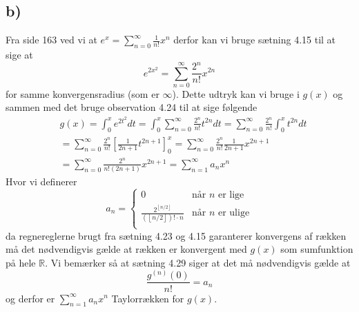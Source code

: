 \documentclass{article}
\newcommand{\m}[1]{\mathbb{#1}}
\newcommand{\mR}{\m{R}}
\newcommand{\lrb}[1]{\left[ #1\right]}
\newcommand{\floor}[1]{\left\lfloor #1\right\rfloor}
\begin{document}
\subsection*{b)}
Fra side 163 \cite{an1} ved vi at $e^x = \sum_{n=0}^{\infty}{\frac{1}{n!}x^n}$ derfor kan vi bruge sætning 4.15 
til at sige at
\[
    e^{2x^2} = \sum_{n=0}^{\infty} \frac{2^n}{n!} x^{2n}
\]
for samme konvergensradius (som er $\infty$).
Dette udtryk kan vi bruge i $g(x)$ og sammen med det bruge observation 4.24 \cite{an1} til at sige følgende
\begin{align*}
    &g(x) = \int_{0}^{x} e^{2t^2} dt
    = \int_{0}^{x} \sum_{n=0}^{\infty} \frac{2^n}{n!} t^{2n} dt
    = \sum_{n=0}^{\infty} \frac{2^n}{n!} \int_{0}^{x} t^{2n} dt \\
    &= \sum_{n=0}^{\infty} \frac{2^n}{n!} \lrb{\frac{1}{2n+1} t^{2n+1}}_{0}^x
    = \sum_{n=0}^{\infty} \frac{2^n}{n!} \frac{1}{2n+1} x^{2n+1} \\
    &= \sum_{n=0}^{\infty} \frac{2^n}{n!(2n+1)} x^{2n+1}
    = \sum_{n=1}^{\infty} a_n x^{n}
\end{align*}
Hvor vi definerer
\[
    a_n = 
    \begin{cases}
    0 & \text{når } n \text{ er lige} \\
    \frac{2^{\floor{n/2}}}{(\floor{n/2})! \cdot n} & \text{når } n \text{ er ulige} \\
    \end{cases} 
\]
da regnereglerne brugt fra sætning 4.23 og 4.15 \cite{an1} garanterer konvergens af rækken må det nødvendigvis
gælde at rækken er konvergent med $g(x)$ som sumfunktion på hele $\mR$.
Vi bemærker så at sætning 4.29 siger at det må nødvendigvis gælde at
\[
\frac{g^{(n)}(0)}{n!} = a_n
\]
og derfor er $\sum_{n=1}^{\infty} a_n x^{n}$ Taylorrækken for $g(x)$.





\end{document}
